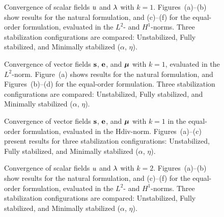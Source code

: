 
\begin{figure}[h!]
	\centering
	\caption{Convergence of scalar fields $u$ and $\lambda$ with $k=1$. Figures~(a)--(b) show results for the natural formulation, and (c)--(f) for the equal-order formulation, evaluated in the $L^{2}$- and $H^{1}$-norms. Three stabilization configurations are compared: Unstabilized, Fully stabilized, and Minimally stabilized ($\alpha$, $\eta$).}
	\def\svgwidth{1.0\columnwidth}
	
	\label{fig:convergence_scalar_quadratic}
\end{figure}


\begin{figure}[h!]
	\centering
	\caption{Convergence of vector fields $\mathbf{s}$, $\mathbf{e}$, and $\boldsymbol{\mu}$ with $k=1$, evaluated in the $L^{2}$-norm. Figure~(a) shows results for the natural formulation, and Figures~(b)--(d) for the equal-order formulation. Three stabilization configurations are compared: Unstabilized, Fully stabilized, and Minimally stabilized ($\alpha$, $\eta$).}
	\def\svgwidth{1.0\columnwidth}
	
	\label{fig:convergence_vector_quadratic}
\end{figure}

\begin{figure}[h!]
	\centering
	\caption{Convergence of vector fields $\mathbf{s}$, $\mathbf{e}$, and $\boldsymbol{\mu}$ with $k=1$ in the equal-order formulation, evaluated in the $\text{Hdiv}$-norm. Figures~(a)--(c) present results for three stabilization configurations: Unstabilized, Fully stabilized, and Minimally stabilized ($\alpha$, $\eta$).}
	\def\svgwidth{1.0\columnwidth}
	
	\label{fig:convergence_vector_quadratic_hdiv}
\end{figure}




\begin{figure}[h!]
	\centering
	\caption{Convergence of scalar fields $u$ and $\lambda$ with $k=2$. Figures~(a)--(b) show results for the natural formulation, and (c)--(f) for the equal-order formulation, evaluated in the $L^{2}$- and $H^{1}$-norms. Three stabilization configurations are compared: Unstabilized, Fully stabilized, and Minimally stabilized ($\alpha$, $\eta$).}
	\def\svgwidth{1.0\columnwidth}
	
	\label{fig:convergence_scalar_cubic}
\end{figure}



